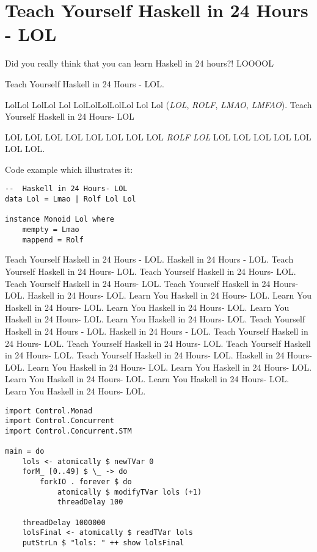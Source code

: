 \section{Teach Yourself Haskell in 24 Hours - LOL}

Did you really think that you can learn Haskell in 24 hours?! LOOOOL

Teach Yourself Haskell in 24 Hours - LOL.

LolLol LolLol Lol LolLolLolLolLol Lol Lol (\emph{LOL}, \emph{ROLF}, \emph{LMAO}, \emph{LMFAO}). Teach Yourself Haskell in 24 Hours- LOL

LOL LOL LOL LOL LOL LOL LOL LOL \emph{ROLF LOL} LOL LOL LOL LOL LOL LOL LOL.

Code example which illustrates it:

\begin{verbatim}
--  Haskell in 24 Hours- LOL
data Lol = Lmao | Rolf Lol Lol

instance Monoid Lol where
    mempty = Lmao
    mappend = Rolf

\end{verbatim}

Teach Yourself Haskell in 24 Hours - LOL.  Haskell in 24 Hours - LOL. Teach Yourself Haskell in 24 Hours- LOL. Teach Yourself Haskell in 24 Hours- LOL. Teach Yourself Haskell in 24 Hours- LOL. Teach Yourself Haskell in 24 Hours- LOL.  Haskell in 24 Hours- LOL. Learn You Haskell in 24 Hours- LOL. Learn You Haskell in 24 Hours- LOL. Learn You Haskell in 24 Hours- LOL. Learn You Haskell in 24 Hours- LOL. Learn You Haskell in 24 Hours- LOL.
Teach Yourself Haskell in 24 Hours - LOL.  Haskell in 24 Hours - LOL. Teach Yourself Haskell in 24 Hours- LOL. Teach Yourself Haskell in 24 Hours- LOL. Teach Yourself Haskell in 24 Hours- LOL. Teach Yourself Haskell in 24 Hours- LOL.  Haskell in 24 Hours- LOL. Learn You Haskell in 24 Hours- LOL. Learn You Haskell in 24 Hours- LOL. Learn You Haskell in 24 Hours- LOL. Learn You Haskell in 24 Hours- LOL. Learn You Haskell in 24 Hours- LOL.

\begin{verbatim}
import Control.Monad
import Control.Concurrent
import Control.Concurrent.STM

main = do
    lols <- atomically $ newTVar 0
    forM_ [0..49] $ \_ -> do
        forkIO . forever $ do
            atomically $ modifyTVar lols (+1)
            threadDelay 100

    threadDelay 1000000
    lolsFinal <- atomically $ readTVar lols
    putStrLn $ "lols: " ++ show lolsFinal
\end{verbatim}

